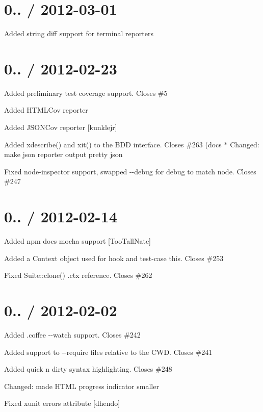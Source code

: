 \section*{0.. / 2012-\/03-\/01}


\begin{DoxyItemize}
\item Added string diff support for terminal reporters
\end{DoxyItemize}

\section*{0.. / 2012-\/02-\/23}


\begin{DoxyItemize}
\item Added preliminary test coverage support. Closes \#5
\item Added {\ttfamily H\+T\+M\+L\+Cov} reporter
\item Added {\ttfamily J\+S\+O\+N\+Cov} reporter \mbox{[}kunklejr\mbox{]}
\item Added {\ttfamily xdescribe()} and {\ttfamily xit()} to the B\+DD interface. Closes \#263 (docs $\ast$ Changed\+: make json reporter output pretty json
\item Fixed node-\/inspector support, swapped {\ttfamily -\/-\/debug} for {\ttfamily debug} to match node. Closes \#247
\end{DoxyItemize}

\section*{0.. / 2012-\/02-\/14}


\begin{DoxyItemize}
\item Added {\ttfamily npm docs mocha} support \mbox{[}Too\+Tall\+Nate\mbox{]}
\item Added a {\ttfamily Context} object used for hook and test-\/case this. Closes \#253
\item Fixed {\ttfamily Suite\+::clone()} {\ttfamily .ctx} reference. Closes \#262
\end{DoxyItemize}

\section*{0.. / 2012-\/02-\/02}


\begin{DoxyItemize}
\item Added .coffee {\ttfamily -\/-\/watch} support. Closes \#242
\item Added support to {\ttfamily -\/-\/require} files relative to the C\+WD. Closes \#241
\item Added quick n dirty syntax highlighting. Closes \#248
\item Changed\+: made H\+T\+ML progress indicator smaller
\item Fixed xunit errors attribute \mbox{[}dhendo\mbox{]}
\end{DoxyItemize}

